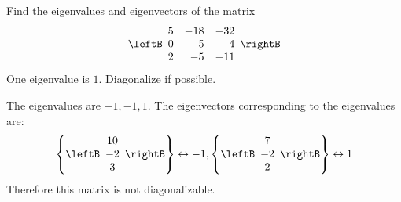 \begin{enumialphparenastyle}

\begin{ex} Find the eigenvalues and eigenvectors of the matrix 
\begin{equation*}
\leftB
\begin{array}{rrr}
5 & -18 & -32 \\
0 & 5 & 4 \\
2 & -5 & -11
\end{array}
\rightB
\end{equation*}
One eigenvalue is $1.$ Diagonalize if possible.
\begin{sol}
The eigenvalues are $-1, -1, 1$. The eigenvectors corresponding to the eigenvalues are:
\[
\left\{ \leftB
\begin{array}{c}
10 \\
-2 \\
3
\end{array}
\rightB \right\} \leftrightarrow -1,  \left\{ \leftB
\begin{array}{c}
7 \\
-2 \\
2
\end{array}
\rightB \right\} \leftrightarrow 1
\]
Therefore this matrix is not diagonalizable. 
\end{sol}
\end{ex}


\end{enumialphparenastyle}

